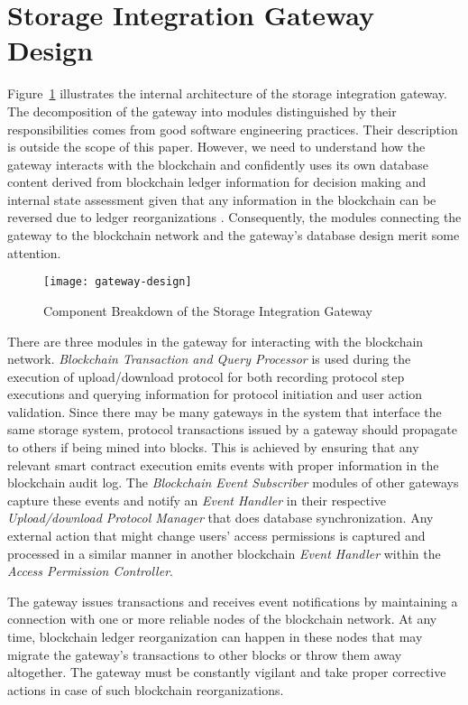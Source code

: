 \section{Storage Integration Gateway Design}
Figure~\ref{fig:gatew} illustrates the internal architecture of the storage integration gateway. The decomposition of the gateway into modules distinguished by their responsibilities comes from good software engineering practices. Their description is outside the scope of this paper. However, we need to understand how the gateway interacts with the blockchain and confidently uses its own database content derived from blockchain ledger information for decision making and internal state assessment given that any information in the blockchain can be reversed due to ledger reorganizations \cite{reorg}. Consequently, the modules connecting the gateway to the blockchain network and the gateway's database design merit some attention.       
\label{s-gate}
\begin{figure}[h]
\centering
\texttt{[image: gateway-design]}                    
\caption{Component Breakdown of the Storage Integration Gateway}\label{fig:gatew}
\end{figure}

There are three modules in the gateway for interacting with the blockchain network. {\it Blockchain Transaction and Query Processor} is used during the execution of upload/download protocol for both recording protocol step executions and querying information for protocol initiation and user action validation. Since there may be many gateways in the system that interface the same storage system, protocol transactions issued by a gateway should propagate to others if being mined into blocks. This is achieved by ensuring that any relevant smart contract execution emits events with proper information in the blockchain audit log. The {\it Blockchain Event Subscriber} modules of other gateways capture these events and notify an {\it Event Handler} in their respective {\it Upload/download Protocol Manager} that does database synchronization. Any external action that might change users' access permissions is captured and processed in a similar manner in another blockchain {\it Event Handler} within the {\it Access Permission Controller}.

The gateway issues transactions and receives event notifications by maintaining a connection with one or more reliable nodes of the blockchain network. At any time, blockchain ledger reorganization can happen in these nodes that may migrate the gateway's transactions to other blocks or throw them away altogether. The gateway must be constantly vigilant and take proper corrective actions in case of such blockchain reorganizations.

